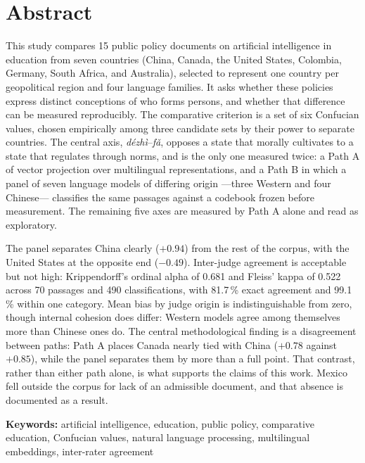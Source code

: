 \vspace{1cm}

\chapter*{Abstract}

This study compares 15 public policy documents on artificial intelligence in education from seven countries (China, Canada, the United States, Colombia, Germany, South Africa, and Australia), selected to represent one country per geopolitical region and four language families. It asks whether these policies express distinct conceptions of who forms persons, and whether that difference can be measured reproducibly. The comparative criterion is a set of six Confucian values, chosen empirically among three candidate sets by their power to separate countries. The central axis, \emph{dézhì}--\emph{fǎ}, opposes a state that morally cultivates to a state that regulates through norms, and is the only one measured twice: a Path A of vector projection over multilingual representations, and a Path B in which a panel of seven language models of differing origin ---three Western and four Chinese--- classifies the same passages against a codebook frozen before measurement. The remaining five axes are measured by Path A alone and read as exploratory.

The panel separates China clearly ($+0.94$) from the rest of the corpus, with the United States at the opposite end ($-0.49$). Inter-judge agreement is acceptable but not high: Krippendorff's ordinal alpha of 0.681 and Fleiss' kappa of 0.522 across 70 passages and 490 classifications, with 81.7\,\% exact agreement and 99.1\,\% within one category. Mean bias by judge origin is indistinguishable from zero, though internal cohesion does differ: Western models agree among themselves more than Chinese ones do. The central methodological finding is a disagreement between paths: Path A places Canada nearly tied with China ($+0.78$ against $+0.85$), while the panel separates them by more than a full point. That contrast, rather than either path alone, is what supports the claims of this work. Mexico fell outside the corpus for lack of an admissible document, and that absence is documented as a result.

\textbf{Keywords:} artificial intelligence, education, public policy, comparative education, Confucian values, natural language processing, multilingual embeddings, inter-rater agreement
